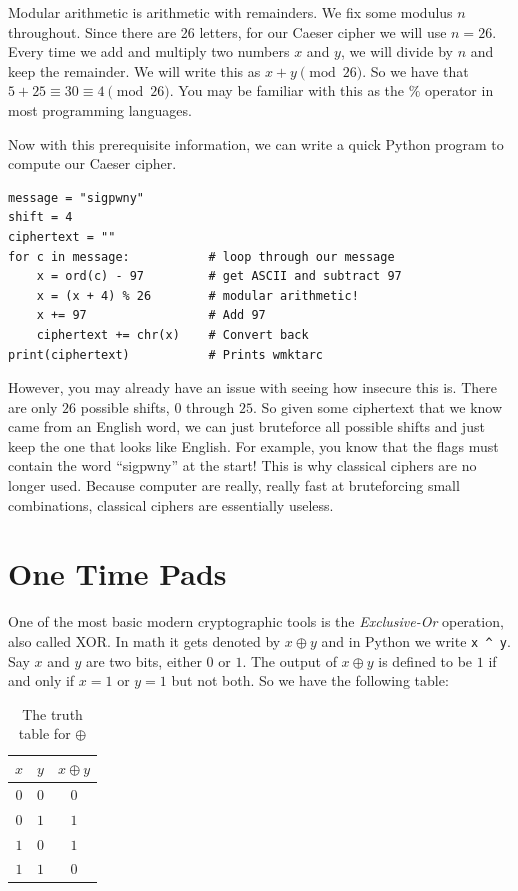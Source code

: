 \documentclass[letterpaper]{article}
\begin{document}
Modular arithmetic is arithmetic with remainders.
We fix some modulus $n$ throughout.
Since there are 26 letters, for our Caeser cipher we will use $n = 26$.
Every time we add and multiply two numbers $x$ and $y$, we will divide by $n$ and keep the remainder.
We will write this as $x + y \pmod{26}$.
So we have that $5 + 25 \equiv 30 \equiv 4 \pmod{26}$.
You may be familiar with this as the $\%$ operator in most programming languages.

Now with this prerequisite information, we can write a quick Python program to compute our Caeser cipher.
\begin{verbatim}
message = "sigpwny"
shift = 4
ciphertext = ""
for c in message:           # loop through our message
    x = ord(c) - 97         # get ASCII and subtract 97
    x = (x + 4) % 26        # modular arithmetic!
    x += 97                 # Add 97
    ciphertext += chr(x)    # Convert back
print(ciphertext)           # Prints wmktarc
\end{verbatim}

However, you may already have an issue with seeing how insecure this is.
There are only $26$ possible shifts, $0$ through $25$.
So given some ciphertext that we know came from an English word, we can just bruteforce all possible shifts and just keep the one that looks like English.
For example, you know that the flags must contain the word ``sigpwny'' at the start!
This is why classical ciphers are no longer used.
Because computer are really, really fast at bruteforcing small combinations, classical ciphers are essentially useless.

\section*{One Time Pads}

One of the most basic modern cryptographic tools is the \emph{Exclusive-Or} operation, also called XOR.
In math it gets denoted by $x \oplus y$ and in Python we write \texttt{x ^ y}.
Say $x$ and $y$ are two bits, either $0$ or $1$.
The output of $x \oplus y$ is defined to be $1$ if and only if $x = 1$ or $y = 1$ but not both.
So we have the following table:
\begin{table}[H]
  \centering
  \begin{tabular}{c|c|c}
    $x$ & $y$ & $x \oplus y$ \\
    \hline
    $0$ & $0$ & $0$ \\
    $0$ & $1$ & $1$ \\
    $1$ & $0$ & $1$ \\
    $1$ & $1$ & $0$ \\
  \end{tabular}
  \caption{The truth table for $\oplus$}
  \label{tab:xor}
\end{table}
\end{document}

